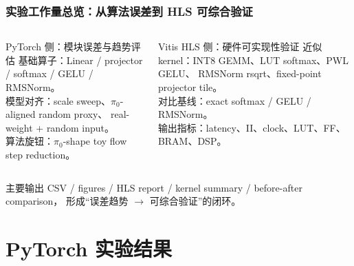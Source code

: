 \documentclass[10pt, aspectratio=169]{beamer}
\begin{document}
\begin{frame}
  \frametitle{实验工作量总览：从算法误差到 HLS 可综合验证}
  \small
  \begin{columns}[T,onlytextwidth]
    \begin{block}{PyTorch 侧：模块误差与趋势评估}
      \scriptsize
      基础算子：Linear / projector / softmax / GELU / RMSNorm。\\
      \vspace{2pt}
      模型对齐：scale sweep、$\pi_0$-aligned random proxy、
      real-weight + random input。\\
      \vspace{2pt}
      算法旋钮：$\pi_0$-shape toy flow step reduction。
    \end{block}

    \begin{alertblock}{Vitis HLS 侧：硬件可实现性验证}
      \scriptsize
      近似 kernel：INT8 GEMM、LUT softmax、PWL GELU、
      RMSNorm rsqrt、fixed-point projector tile。\\
      \vspace{2pt}
      对比基线：exact softmax / GELU / RMSNorm。\\
      \vspace{2pt}
      输出指标：latency、II、clock、LUT、FF、BRAM、DSP。
    \end{alertblock}
  \end{columns}

  \vspace{3pt}
  \begin{exampleblock}{主要输出}
    CSV / figures / HLS report / kernel summary / before-after comparison，
    形成“误差趋势 $\rightarrow$ 可综合验证”的闭环。
  \end{exampleblock}
\end{frame}

\section{PyTorch 实验结果}
\end{document}
